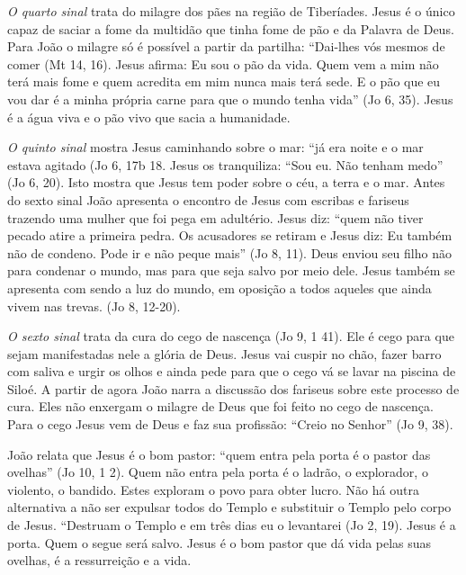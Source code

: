 \documentclass[
]{book}
\begin{document}
\emph{O quarto sinal} trata do milagre dos pães na região de Tiberíades. Jesus é o único capaz de saciar a fome da multidão que tinha fome de pão e da Palavra de Deus. Para João o milagre só é possível a partir da partilha: ``Dai-lhes vós mesmos de comer (Mt 14, 16). Jesus afirma: Eu sou o pão da vida. Quem vem a mim não terá mais fome e quem acredita em mim nunca mais terá sede. E o pão que eu vou dar é a minha própria carne para que o mundo tenha vida'' (Jo 6, 35). Jesus é a água viva e o pão vivo que sacia a humanidade.

\emph{O quinto sinal} mostra Jesus caminhando sobre o mar: ``já era noite e o mar estava agitado (Jo 6, 17b 18. Jesus os tranquiliza: ``Sou eu. Não tenham medo'' (Jo 6, 20). Isto mostra que Jesus tem poder sobre o céu, a terra e o mar.
Antes do sexto sinal João apresenta o encontro de Jesus com escribas e fariseus trazendo uma mulher que foi pega em adultério. Jesus diz: ``quem não tiver pecado atire a primeira pedra. Os acusadores se retiram e Jesus diz: Eu também não de condeno. Pode ir e não peque mais'' (Jo 8, 11). Deus enviou seu filho não para condenar o mundo, mas para que seja salvo por meio dele. Jesus também se apresenta com sendo a luz do mundo, em oposição a todos aqueles que ainda vivem nas trevas. (Jo 8, 12-20).

\emph{O sexto sinal} trata da cura do cego de nascença (Jo 9, 1 41). Ele é cego para que sejam manifestadas nele a glória de Deus. Jesus vai cuspir no chão, fazer barro com saliva e urgir os olhos e ainda pede para que o cego vá se lavar na piscina de Siloé. A partir de agora João narra a discussão dos fariseus sobre este processo de cura. Eles não enxergam o milagre de Deus que foi feito no cego de nascença. Para o cego Jesus vem de Deus e faz sua profissão: ``Creio no Senhor'' (Jo 9, 38).

João relata que Jesus é o bom pastor: ``quem entra pela porta é o pastor das ovelhas'' (Jo 10, 1 2). Quem não entra pela porta é o ladrão, o explorador, o violento, o bandido. Estes exploram o povo para obter lucro. Não há outra alternativa a não ser expulsar todos do Templo e substituir o Templo pelo corpo de Jesus. ``Destruam o Templo e em três dias eu o levantarei (Jo 2, 19). Jesus é a porta. Quem o segue será salvo. Jesus é o bom pastor que dá vida pelas suas ovelhas, é a ressurreição e a vida.
\end{document}
